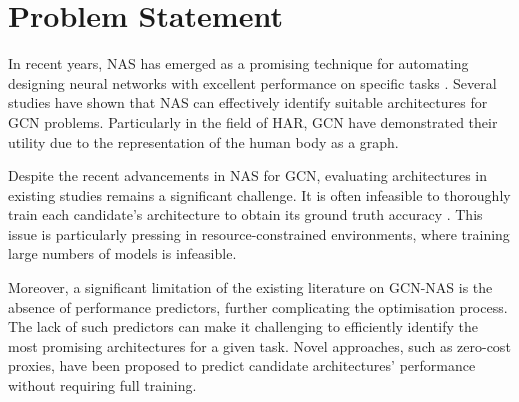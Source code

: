 \section{Problem Statement}\label{ProblemStatement}
In recent years, \gls{NAS} has emerged as a promising technique for automating designing neural networks with excellent performance on specific tasks \autocite{zoph2016neural}. Several studies have shown that \gls{NAS} can effectively identify suitable architectures for \gls{GCN} problems. Particularly in the field of \gls{HAR}, \gls{GCN} have demonstrated their utility due to the representation of the human body as a graph. 

Despite the recent advancements in \gls{NAS} for \gls{GCN}, evaluating architectures in existing studies remains a significant challenge. It is often infeasible to thoroughly train each candidate's architecture to obtain its ground truth accuracy \autocite{zoph2016neural}. This issue is particularly pressing in resource-constrained environments, where training large numbers of models is infeasible.

Moreover, a significant limitation of the existing literature on \gls{GCN}-\gls{NAS} is the absence of performance predictors, further complicating the optimisation process. The lack of such predictors can make it challenging to efficiently identify the most promising architectures for a given task. Novel approaches, such as zero-cost proxies, have been proposed to predict candidate architectures' performance without requiring full training.

\begin{comment}
    
However, there is still much work to be done in exploring the usefulness of these approaches and optimising them for \gls{GCN}-\gls{NAS}.
\end{comment}